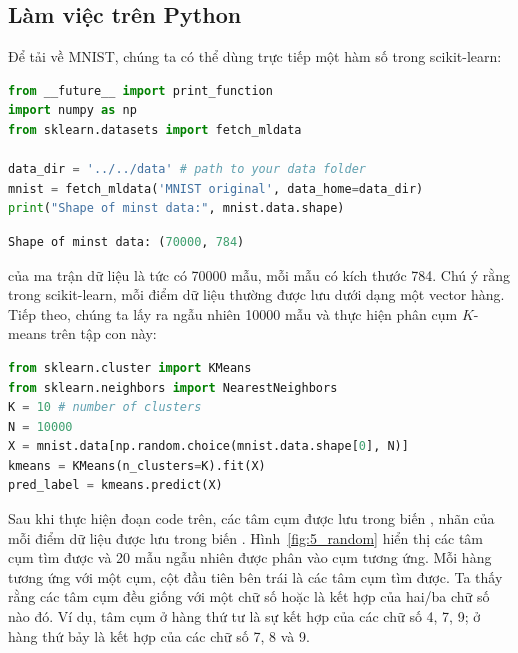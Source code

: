 

\subsection{Làm việc trên Python}
Để tải về MNIST, chúng ta có thể dùng trực tiếp một hàm số trong scikit-learn:

\begin{lstlisting}[language=Python]
from __future__ import print_function 
import numpy as np 
from sklearn.datasets import fetch_mldata

data_dir = '../../data' # path to your data folder 
mnist = fetch_mldata('MNIST original', data_home=data_dir)
print("Shape of minst data:", mnist.data.shape)
\end{lstlisting}
\kq 
\begin{lstlisting}[language=Python]
Shape of minst data: (70000, 784)
\end{lstlisting}
 của ma trận dữ liệu  là
 tức có 70000 mẫu, mỗi mẫu có kích thước 784. Chú ý
rằng trong scikit-learn, mỗi điểm dữ liệu thường được lưu dưới dạng một vector
hàng. Tiếp theo, chúng ta lấy ra ngẫu nhiên 10000 mẫu và thực hiện phân cụm $K$-means
trên tập con này:
\begin{lstlisting}[language=Python]
from sklearn.cluster import KMeans
from sklearn.neighbors import NearestNeighbors
K = 10 # number of clusters 
N = 10000
X = mnist.data[np.random.choice(mnist.data.shape[0], N)]
kmeans = KMeans(n_clusters=K).fit(X)
pred_label = kmeans.predict(X)
\end{lstlisting}





Sau khi thực hiện đoạn code trên, các tâm cụm được lưu trong biến
, nhãn của mỗi điểm dữ liệu được lưu
trong biến . Hình~\ref{fig:5_random} hiển thị các tâm
cụm tìm được và 20 mẫu ngẫu nhiên được phân vào cụm tương ứng. Mỗi hàng tương
ứng với một cụm, cột đầu tiên bên trái là các tâm cụm tìm được. Ta thấy rằng các
tâm cụm đều giống với một chữ số hoặc là kết hợp của hai/ba chữ số nào đó. Ví
dụ, tâm cụm ở hàng thứ tư là sự kết hợp của các chữ số 4, 7, 9; ở hàng thứ bảy là kết
hợp của các chữ số 7, 8 và 9.





